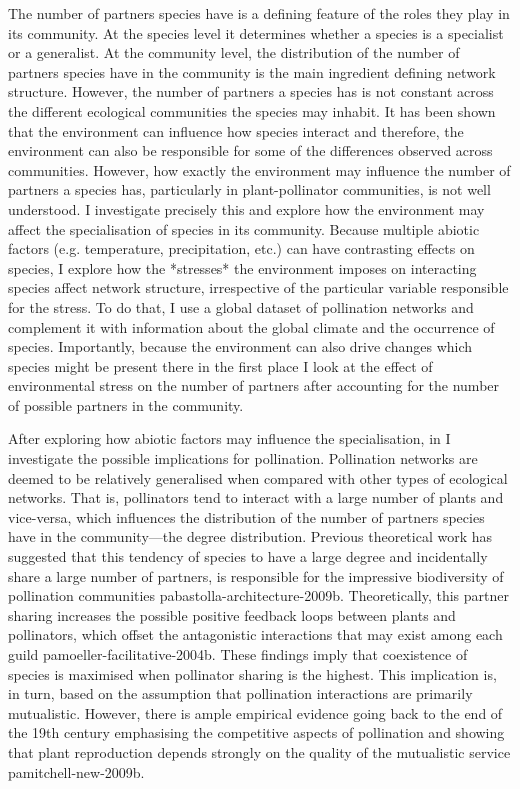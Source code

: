 \begin{refsection}
The number of partners species have is a defining feature of the roles they play in its community.
At the species level it determines whether a species is a specialist or a generalist.
At the community level, the distribution of the number of partners species have in the community is the main ingredient defining network structure.
However, the number of partners a species has is not constant across the different ecological communities the species may inhabit.
It has been shown that the environment can influence how species interact and therefore, the environment can also be responsible for some of the differences observed across communities.
However, how exactly the environment may influence the number of partners a species has, particularly in plant-pollinator communities, is not well understood.
 I investigate precisely this and explore how the environment may affect the specialisation of species in its community.
Because multiple abiotic factors (e.g. temperature, precipitation, etc.) can have contrasting effects on species, I explore how the *stresses* the environment imposes on interacting species affect network structure, irrespective of the particular variable responsible for the stress.
To do that, I use a global dataset of pollination networks and complement it with information about the global climate and the occurrence of species.
Importantly, because the environment can also drive changes which species might be present there in the first place  I look at the effect of environmental stress on the number of partners after accounting for the number of possible partners in the community.

After exploring how abiotic factors may influence the specialisation, in I investigate the possible implications for pollination.
Pollination networks are deemed to be relatively generalised when compared with other types of ecological networks.
That is, pollinators tend to interact with a large number of plants and vice-versa, which influences the distribution of the number of partners species have in the community—the degree distribution.
Previous theoretical work has suggested that this tendency of species to have a large degree and incidentally share a large number of partners, is responsible for the impressive biodiversity of pollination communities pabastolla-architecture-2009b.
Theoretically, this partner sharing increases the possible positive feedback loops between plants and pollinators, which offset the antagonistic interactions that may exist among each guild pamoeller-facilitative-2004b.
These findings imply that coexistence of species is maximised when pollinator sharing is the highest.
This implication is, in turn, based on the assumption that pollination interactions are primarily mutualistic.
However, there is ample empirical evidence going back to the end of the 19th century emphasising the competitive aspects of pollination and showing that plant reproduction depends strongly on the quality of the mutualistic service pamitchell-new-2009b.


\end{refsection}
